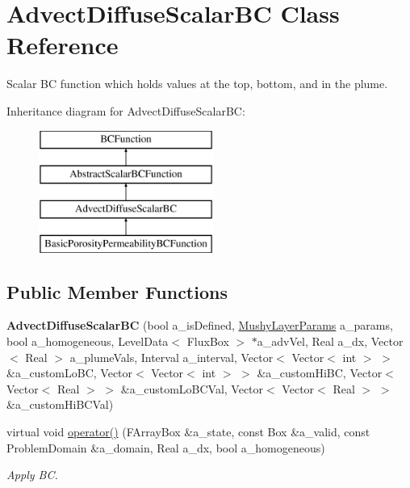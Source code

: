 \hypertarget{class_advect_diffuse_scalar_b_c}{\section{Advect\-Diffuse\-Scalar\-B\-C Class Reference}
\label{class_advect_diffuse_scalar_b_c}
}


Scalar B\-C function which holds values at the top, bottom, and in the plume.  


Inheritance diagram for Advect\-Diffuse\-Scalar\-B\-C\-:\begin{figure}[H]
\begin{center}
\leavevmode
\includegraphics[height=4.000000cm]{class_advect_diffuse_scalar_b_c}
\end{center}
\end{figure}
\subsection*{Public Member Functions}
\begin{DoxyCompactItemize}
\item 
\hypertarget{class_advect_diffuse_scalar_b_c_a2227cd96500613d5eb7918cc6fa3a645}{{\bfseries Advect\-Diffuse\-Scalar\-B\-C} (bool a\-\_\-is\-Defined, \hyperlink{class_mushy_layer_params}{Mushy\-Layer\-Params} a\-\_\-params, bool a\-\_\-homogeneous, Level\-Data$<$ Flux\-Box $>$ $\ast$a\-\_\-adv\-Vel, Real a\-\_\-dx, Vector$<$ Real $>$ a\-\_\-plume\-Vals, Interval a\-\_\-interval, Vector$<$ Vector$<$ int $>$ $>$ \&a\-\_\-custom\-Lo\-B\-C, Vector$<$ Vector$<$ int $>$ $>$ \&a\-\_\-custom\-Hi\-B\-C, Vector$<$ Vector$<$ Real $>$ $>$ \&a\-\_\-custom\-Lo\-B\-C\-Val, Vector$<$ Vector$<$ Real $>$ $>$ \&a\-\_\-custom\-Hi\-B\-C\-Val)}\label{class_advect_diffuse_scalar_b_c_a2227cd96500613d5eb7918cc6fa3a645}

\item 
\hypertarget{class_advect_diffuse_scalar_b_c_ab55b1f2a27a3ff1ecda0d56acdbf0d77}{virtual void \hyperlink{class_advect_diffuse_scalar_b_c_ab55b1f2a27a3ff1ecda0d56acdbf0d77}{operator()} (F\-Array\-Box \&a\-\_\-state, const Box \&a\-\_\-valid, const Problem\-Domain \&a\-\_\-domain, Real a\-\_\-dx, bool a\-\_\-homogeneous)}\label{class_advect_diffuse_scalar_b_c_ab55b1f2a27a3ff1ecda0d56acdbf0d77}

\begin{DoxyCompactList}\small\item\em Apply B\-C. \end{DoxyCompactList}\end{DoxyCompactItemize}
